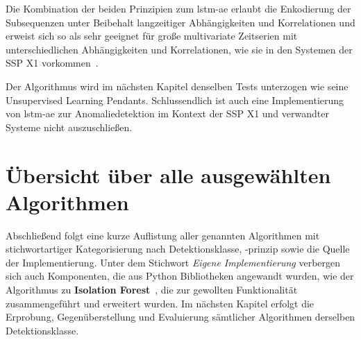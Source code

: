 Die Kombination der beiden Prinzipien zum \ac{lstm-ae} erlaubt die Enkodierung der Subsequenzen unter Beibehalt langzeitiger Abhängigkeiten und Korrelationen
und erweist sich so als sehr geeignet für große multivariate Zeitserien mit unterschiedlichen Abhängigkeiten und Korrelationen, wie sie in den Systemen
der SSP X1 vorkommen~\cite{Wei2022}.

Der Algorithmus wird im nächsten Kapitel denselben Tests unterzogen wie seine Unsupervised Learning Pendants. Schlussendlich ist auch eine
Implementierung von \ac{lstm-ae} zur Anomaliedetektion im Kontext der SSP X1 und verwandter Systeme nicht auszuschließen.

\section{Übersicht über alle ausgewählten Algorithmen}

Abschließend folgt eine kurze Auflistung aller genannten Algorithmen mit stichwortartiger Kategorisierung nach Detektionsklasse, -prinzip sowie die Quelle der
Implementierung. Unter dem Stichwort \textit{Eigene Implementierung} verbergen sich auch Komponenten, die aus Python Bibliotheken angewandt wurden, wie der
Algorithmus zu \textbf{Isolation Forest}~\cite{scikit-learn}, die zur gewollten Funktionalität
zusammengeführt und erweitert wurden. Im nächsten Kapitel erfolgt die Erprobung, Gegenüberstellung und Evaluierung sämtlicher Algorithmen derselben
Detektionsklasse.

